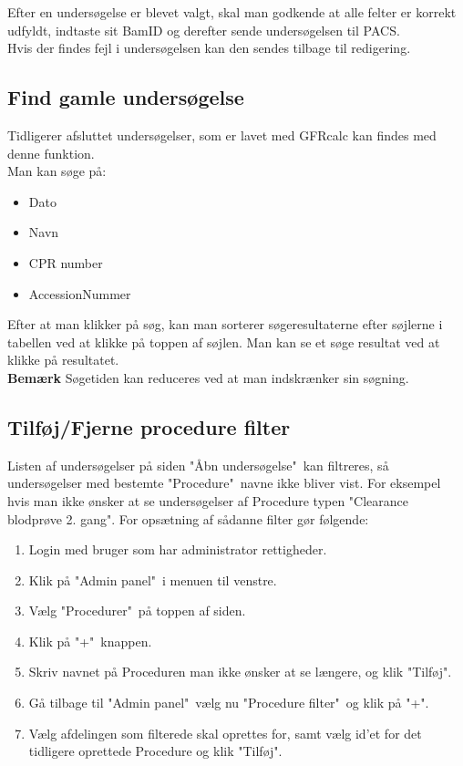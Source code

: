 \documentclass{article}
\begin{document}
Efter en undersøgelse er blevet valgt, skal man godkende at alle felter er korrekt udfyldt, indtaste sit BamID og derefter sende undersøgelsen til PACS.\\

Hvis der findes fejl i undersøgelsen kan den sendes tilbage til redigering.

\subsection{Find gamle undersøgelse}\label{search}
Tidligerer afsluttet undersøgelser, som er lavet med GFRcalc kan findes med denne funktion.\\
Man kan søge på:
\begin{itemize}
	\item Dato
	\item Navn
	\item CPR number
	\item AccessionNummer 
\end{itemize}
Efter at man klikker på søg, kan man sorterer søgeresultaterne efter søjlerne i tabellen ved at klikke på toppen af søjlen. Man kan se et søge resultat ved at klikke på resultatet.\\

\textbf{Bemærk} Søgetiden kan reduceres ved at man indskrænker sin søgning. 

\subsection{Tilføj/Fjerne procedure filter}
Listen af undersøgelser på siden "Åbn undersøgelse"\ kan filtreres, så undersøgelser med bestemte "Procedure"\ navne ikke bliver vist. For eksempel hvis man ikke ønsker at se undersøgelser af Procedure typen "Clearance blodprøve 2. gang". For opsætning af sådanne filter gør følgende:
\begin{enumerate}
	\item Login med bruger som har administrator rettigheder.
	\item Klik på "Admin panel"\ i menuen til venstre.
	\item Vælg "Procedurer"\ på toppen af siden.
	\item Klik på "+"\ knappen.
	\item Skriv navnet på Proceduren man ikke ønsker at se længere, og klik "Tilføj".
	\item Gå tilbage til "Admin panel"\, vælg nu "Procedure filter"\ og klik på "+".
	\item Vælg afdelingen som filterede skal oprettes for, samt vælg id'et for det tidligere oprettede Procedure og klik "Tilføj".
\end{enumerate}
\end{document}
